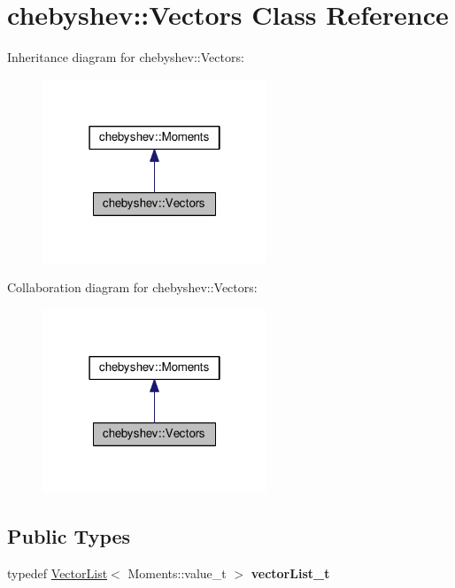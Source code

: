 \hypertarget{classchebyshev_1_1_vectors}{}\section{chebyshev\+:\+:Vectors Class Reference}
\label{classchebyshev_1_1_vectors}


Inheritance diagram for chebyshev\+:\+:Vectors\+:\nopagebreak
\begin{figure}[H]
\begin{center}
\leavevmode
\includegraphics[width=190pt]{classchebyshev_1_1_vectors__inherit__graph}
\end{center}
\end{figure}


Collaboration diagram for chebyshev\+:\+:Vectors\+:\nopagebreak
\begin{figure}[H]
\begin{center}
\leavevmode
\includegraphics[width=190pt]{classchebyshev_1_1_vectors__coll__graph}
\end{center}
\end{figure}
\subsection*{Public Types}
\begin{DoxyCompactItemize}
\item 
typedef \hyperlink{class_vector_list}{Vector\+List}$<$ Moments\+::value\+\_\+t $>$ {\bfseries vector\+List\+\_\+t}\hypertarget{classchebyshev_1_1_vectors_a1a6e132ce26c89c86e3c1d2df240cdad}{}\label{classchebyshev_1_1_vectors_a1a6e132ce26c89c86e3c1d2df240cdad}

\end{DoxyCompactItemize}
